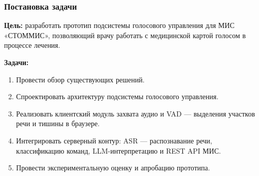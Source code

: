 \documentclass{beamer}
\begin{document}
\begin{frame}
  \frametitle{Постановка задачи}
  \textbf{Цель:} разработать прототип подсистемы голосового управления для МИС «СТОММИС», позволяющий врачу работать с медицинской картой голосом в процессе лечения.

  \vspace{6pt}

  \textbf{Задачи:}
  \begin{enumerate}
    \item Провести обзор существующих решений.
    \item Спроектировать архитектуру подсистемы голосового управления.
    \item Реализовать клиентский модуль захвата аудио и VAD — выделения участков речи и тишины в браузере.
    \item Интегрировать серверный контур: ASR — распознавание речи, классификацию команд, LLM-интерпретацию и REST API МИС.
    \item Провести экспериментальную оценку и апробацию прототипа.

  \end{enumerate}
\end{frame}
\end{document}
